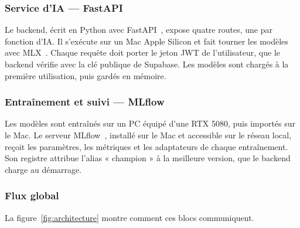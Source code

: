 \subsubsection{Service d'IA --- FastAPI}

Le backend, écrit en Python avec FastAPI~\cite{fastapi}, expose quatre routes, une par
fonction d'IA. Il s'exécute sur un Mac Apple Silicon et fait tourner les modèles avec
MLX~\cite{mlx}. Chaque requête doit porter le jeton JWT de l'utilisateur, que le backend
vérifie avec la clé publique de Supabase. Les modèles sont chargés à la première
utilisation, puis gardés en mémoire.

\subsubsection{Entraînement et suivi --- MLflow}

Les modèles sont entraînés sur un PC équipé d'une RTX 5080, puis importés sur le Mac.
Le serveur MLflow~\cite{mlflow_docs}, installé sur le Mac et accessible sur le réseau local,
reçoit les paramètres, les métriques et les adaptateurs de chaque entraînement. Son registre
attribue l'alias « champion » à la meilleure version, que le backend charge au démarrage.

\subsubsection{Flux global}

La figure~\ref{fig:architecture} montre comment ces blocs communiquent.

